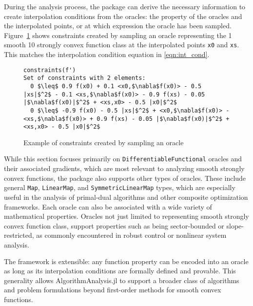 During the analysis process, the package can derive the necessary information to create interpolation conditions from the oracles: the property of the oracles and the interpolated points, or at which expression the oracle has been sampled. Figure~\ref{ex_orc_constraints} shows constraints created by sampling an oracle representing the 1 smooth 10 strongly convex function class at the interpolated points \texttt{x0} and \texttt{xs}. This matches the interpolation condition equation in \ref*{eqn:int_cond}.

\begin{figure}[!h]
	\begin{lstlisting}[mathescape]
constraints(f')
Set of constraints with 2 elements:
  0 $\leq$ 0.9 f(x0) + 0.1 <x0,$\nabla$f(x0)> - 0.5 |xs|$^2$ - 0.1 <xs,$\nabla$f(x0)> - 0.9 f(xs) - 0.05 |$\nabla$f(x0)|$^2$ + <xs,x0> - 0.5 |x0|$^2$
  0 $\leq$ -0.9 f(x0) - 0.5 |xs|$^2$ + <x0,$\nabla$f(x0)> - <xs,$\nabla$f(x0)> + 0.9 f(xs) - 0.05 |$\nabla$f(x0)|$^2$ + <xs,x0> - 0.5 |x0|$^2$
	\end{lstlisting}
	\caption{Example of constraints created by sampling an oracle}
	\label{ex_orc_constraints}
\end{figure}

While this section focuses primarily on \texttt{DifferentiableFunctional} oracles and their associated gradients, which are most relevant to analyzing smooth strongly convex functions, the package also supports other types of oracles. These include general \texttt{Map}, \texttt{LinearMap}, and \texttt{SymmetricLinearMap} types, which are especially useful in the analysis of primal-dual algorithms and other composite optimization frameworks. Each oracle can also be associated with a wide variety of mathematical properties. Oracles not just limited to representing smooth strongly convex function class, support properties such as being sector-bounded or slope-restricted, as commonly encountered in robust control or nonlinear system analysis.

The framework is extensible: any function property can be encoded into an oracle as long as its interpolation conditions are formally defined and provable. This generality allows AlgorithmAnalysis.jl to support a broader class of algorithms and problem formulations beyond first-order methods for smooth convex functions.

